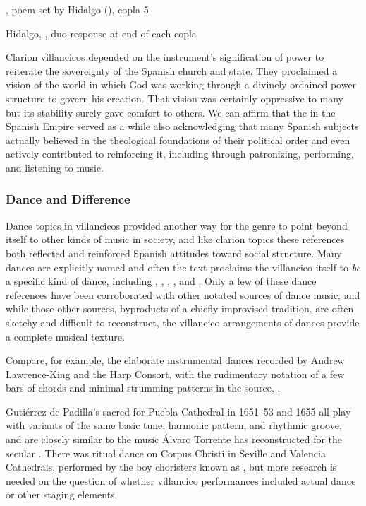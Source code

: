 {, poem set by Hidalgo (), copla 5}

{Hidalgo, , duo response at end of each copla}

Clarion villancicos depended on the instrument's signification of power to
reiterate the sovereignty of the Spanish church and state.
They proclaimed a vision of the world in which God was working through a
divinely ordained power structure to govern his creation.
That vision was certainly oppressive to many but its stability surely gave
comfort to others.
We can affirm that the  in the Spanish Empire served as
a  while also acknowledging that many Spanish
subjects actually believed in the theological foundations of their political
order and even actively contributed to reinforcing it, including through
patronizing, performing, and listening to music.%
    \Autocites
    {Rodriguez:Villancico}
    {Sage:Instrumentum}

\subsubsection{Dance and Difference}

Dance topics in villancicos provided another way for the genre to point beyond
itself to other kinds of music in society, and like clarion topics these
references both reflected and reinforced Spanish attitudes toward social
structure.
Many dances are explicitly named and often the text proclaims the villancico
itself to \emph{be} a specific kind of dance, including ,
, , , and
.
Only a few of these dance references have been corroborated with other notated
sources of dance music, and while those other sources, byproducts of a chiefly
improvised tradition, are often sketchy and difficult to reconstruct, the
villancico arrangements of dances provide a complete musical texture.%
\begin{Footnote}
    Compare, for example, the elaborate instrumental dances recorded by Andrew
    Lawrence-King and the Harp Consort, 
    with the rudimentary notation of a few bars of chords and minimal strumming
    patterns in the source, .
\end{Footnote}
Gutiérrez de Padilla's sacred  for Puebla Cathedral in 1651--53
and 1655 all play with variants of the same basic tune, harmonic pattern, and
rhythmic groove, and are closely similar to the music Álvaro Torrente has
reconstructed for the secular .%
    \Autocite{Torrente:Jacara}
There was ritual dance on Corpus Christi in Seville and Valencia Cathedrals,
performed by the boy choristers known as , but more research is
needed on the question of whether villancico performances included actual dance
or other staging elements.%
    \Autocite{Comes:Danzas}


